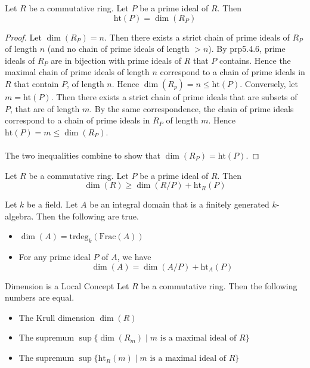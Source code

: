 \documentclass[a4paper]{article}
\begin{document}
\begin{lmm}{}{} Let $R$ be a commutative ring. Let $P$ be a prime ideal of $R$. Then $$\text{ht}(P)=\dim(R_P)$$ \tcbline
\begin{proof}
Let $\dim(R_P)=n$. Then there exists a strict chain of prime ideals of $R_P$ of length $n$ (and no chain of prime ideals of length $>n$). By prp5.4.6, prime ideals of $R_P$ are in bijection with prime ideals of $R$ that $P$ contains. Hence the maximal chain of prime ideals of length $n$ correspond to a chain of prime ideals in $R$ that contain $P$, of length $n$. Hence $\dim(R_p)=n\leq\text{ht}(P)$. Conversely, let $m=\text{ht}(P)$. Then there exists a strict chain of prime ideals that are subsets of $P$, that are of length $m$. By the same correspondence, the chain of prime ideals correspond to a chain of prime ideals in $R_P$ of length $m$. Hence $\text{ht}(P)=m\leq\dim(R_P)$. \\~\\

The two inequalities combine to show that $\dim(R_P)=\text{ht}(P)$. 
\end{proof}
\end{lmm}

\begin{lmm}{}{} Let $R$ be a commutative ring. Let $P$ be a prime ideal of $R$. Then $$\dim(R)\geq\dim(R/P)+\text{ht}_R(P)$$
\end{lmm}

\begin{prp}{}{} Let $k$ be a field. Let $A$ be an integral domain that is a finitely generated $k$-algebra. Then the following are true. 
\begin{itemize}
\item $\dim(A)=\text{trdeg}_k(\text{Frac}(A))$
\item For any prime ideal $P$ of $A$, we have $$\dim(A)=\dim(A/P)+\text{ht}_A(P)$$
\end{itemize}
\end{prp}

\begin{prp}{Dimension is a Local Concept}{} Let $R$ be a commutative ring. Then the following numbers are equal. 
\begin{itemize}
\item The Krull dimension $\dim(R)$
\item The supremum $\sup\{\dim(R_m)\;|\;m\text{ is a maximal ideal of }R\}$
\item The supremum $\sup\{\text{ht}_R(m)\;|\;m\text{ is a maximal ideal of }R\}$
\end{itemize}
\end{prp}
\end{document}
